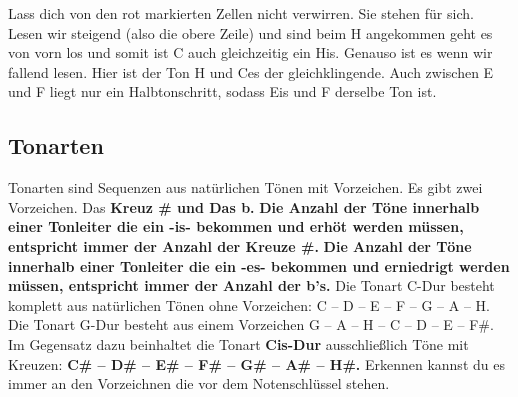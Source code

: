 Lass dich von den rot markierten Zellen nicht verwirren. Sie stehen für sich. Lesen wir steigend (also die obere Zeile) und sind beim H angekommen geht es von vorn los und somit ist C auch gleichzeitig ein His. Genauso ist es wenn wir fallend lesen. Hier ist der Ton H und Ces der gleichklingende. Auch zwischen E und F liegt nur ein Halbtonschritt, sodass Eis und F derselbe Ton ist.

\subsection{Tonarten}
Tonarten sind Sequenzen aus natürlichen Tönen mit Vorzeichen. Es gibt zwei Vorzeichen. Das \textbf{Kreuz \# und Das b.} \textbf{Die Anzahl der Töne innerhalb einer Tonleiter die ein -is- bekommen und erhöt werden müssen, entspricht immer der Anzahl der Kreuze \#.} \textbf{Die Anzahl der Töne innerhalb einer Tonleiter die ein -es- bekommen und erniedrigt werden müssen, entspricht immer der Anzahl der b's.} Die Tonart C-Dur besteht komplett aus natürlichen Tönen ohne Vorzeichen: C – D – E – F – G – A – H. Die Tonart G-Dur besteht aus einem Vorzeichen G – A – H – C – D – E – F\#. Im Gegensatz dazu beinhaltet die Tonart \textbf{Cis-Dur} ausschließlich Töne mit Kreuzen: \textbf{C\# – D\# – E\# – F\# – G\# – A\# – H\#.} Erkennen kannst du es immer an den Vorzeichnen die vor dem Notenschlüssel stehen. 




